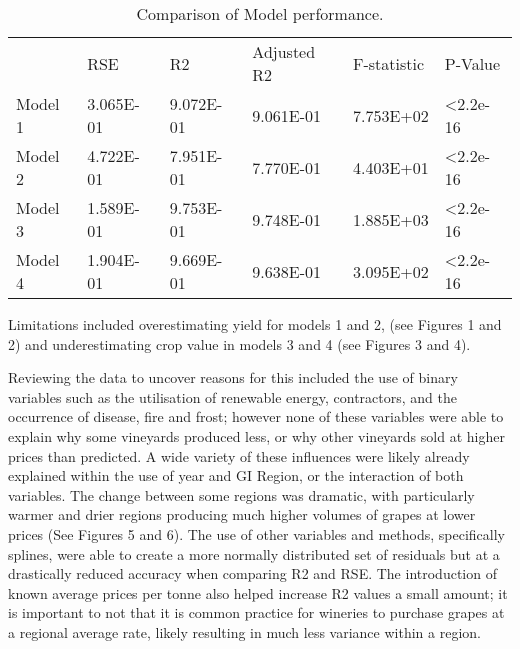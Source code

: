\documentclass[12pt,australian]{article}
\begin{document}
\begin{sloppypar}
\begin{table}[]
  \caption{Comparison of Model performance.}
  \label{tab:tab 11}
  \begin{tabular}{llllll}
          & RSE       & R2        & Adjusted 			R2 & F-statistic & P-Value           \\
  Model 1 & 3.065E-01 & 9.072E-01 & 9.061E-01      & 7.753E+02   & \textless 2.2e-16 \\
  Model 2 & 4.722E-01 & 7.951E-01 & 7.770E-01      & 4.403E+01   & \textless 2.2e-16 \\
  Model 3 & 1.589E-01 & 9.753E-01 & 9.748E-01      & 1.885E+03   & \textless 2.2e-16 \\
  Model 4 & 1.904E-01 & 9.669E-01 & 9.638E-01      & 3.095E+02   & \textless 2.2e-16
  \end{tabular}
\end{table}

Limitations included overestimating yield for models 1 and 2, (see Figures 1 and 2) and underestimating crop value in models 3 and 4 (see Figures 3 and 4).

 Reviewing the data to uncover reasons for this included the use of binary variables such as the utilisation of renewable energy, contractors, and the occurrence of disease, fire and frost; however none of these variables were able to explain why some vineyards produced less, or why other vineyards sold at higher prices than predicted. A wide variety of these influences were likely already explained within the use of year and GI Region, or the interaction of both variables. The change between some regions was dramatic, with particularly warmer and drier regions producing much higher volumes of grapes at lower prices (See Figures 5 and 6). The use of other variables and methods, specifically splines, were able to create a more normally distributed set of residuals but at a drastically reduced accuracy when comparing R2 and RSE. The introduction of known average prices per tonne also helped increase R2 values a small amount; it is important to not that it is common practice for wineries to purchase grapes at a regional average rate, likely resulting in much less variance within a region.




\end{sloppypar}
\end{document}
